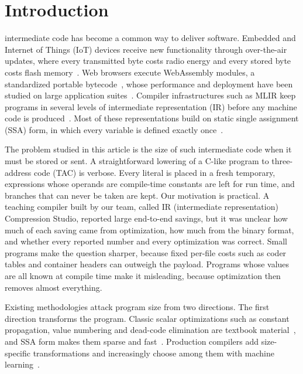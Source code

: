 \documentclass{ieeeaccess}
\begin{document}
\section{Introduction}
\label{sec:introduction}
 intermediate code has become a common way to deliver software. Embedded and Internet of Things (IoT) devices receive new functionality through over-the-air updates, where every transmitted byte costs radio energy and every stored byte costs flash memory~\cite{bauwens2020ota}. Web browsers execute WebAssembly modules, a standardized portable bytecode~\cite{w3c2019wasm}, whose performance and deployment have been studied on large application suites~\cite{jangda2019wasm}. Compiler infrastructures such as MLIR keep programs in several levels of intermediate representation (IR) before any machine code is produced~\cite{lattner2021mlir}. Most of these representations build on static single assignment (SSA) form, in which every variable is defined exactly once~\cite{rastello2022ssa}.

The problem studied in this article is the size of such intermediate code when it must be stored or sent. A straightforward lowering of a C-like program to three-address code (TAC) is verbose. Every literal is placed in a fresh temporary, expressions whose operands are compile-time constants are left for run time, and branches that can never be taken are kept. Our motivation is practical. A teaching compiler built by our team, called IR (intermediate representation) Compression Studio, reported large end-to-end savings, but it was unclear how much of each saving came from optimization, how much from the binary format, and whether every reported number and every optimization was correct. Small programs make the question sharper, because fixed per-file costs such as coder tables and container headers can outweigh the payload. Programs whose values are all known at compile time make it misleading, because optimization then removes almost everything.

Existing methodologies attack program size from two directions. The first direction transforms the program. Classic scalar optimizations such as constant propagation, value numbering and dead-code elimination are textbook material~\cite{cooper2022eac}, and SSA form makes them sparse and fast~\cite{rastello2022ssa}. Production compilers add size-specific transformations and increasingly choose among them with machine learning~\cite{wang2018ml,ashouri2018autotuning}.
\end{document}
